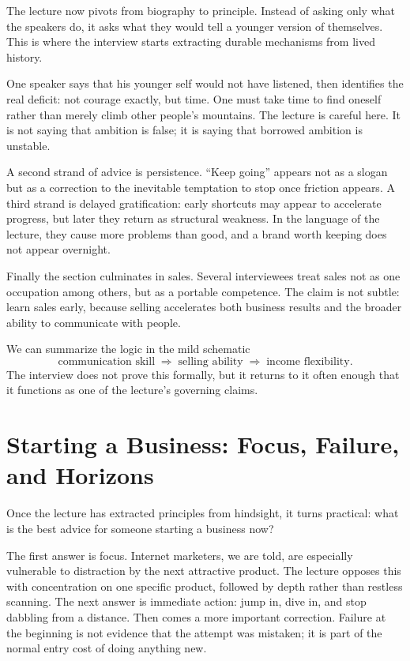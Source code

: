 The lecture now pivots from biography to principle. Instead of asking only what the speakers do, it asks what they would tell a younger version of themselves. This is where the interview starts extracting durable mechanisms from lived history.

One speaker says that his younger self would not have listened, then identifies the real deficit: not courage exactly, but time. One must take time to find oneself rather than merely climb other people's mountains. The lecture is careful here. It is not saying that ambition is false; it is saying that borrowed ambition is unstable.

A second strand of advice is persistence. ``Keep going'' appears not as a slogan but as a correction to the inevitable temptation to stop once friction appears. A third strand is delayed gratification: early shortcuts may appear to accelerate progress, but later they return as structural weakness. In the language of the lecture, they cause more problems than good, and a brand worth keeping does not appear overnight.

Finally the section culminates in sales. Several interviewees treat sales not as one occupation among others, but as a portable competence. The claim is not subtle: learn sales early, because selling accelerates both business results and the broader ability to communicate with people.

We can summarize the logic in the mild schematic
\begin{equation}
\text{communication skill} \;\Longrightarrow\; \text{selling ability} \;\Longrightarrow\; \text{income flexibility}.
\end{equation}
The interview does not prove this formally, but it returns to it often enough that it functions as one of the lecture's governing claims.

\section{Starting a Business: Focus, Failure, and Horizons}

Once the lecture has extracted principles from hindsight, it turns practical: what is the best advice for someone starting a business now?

The first answer is focus. Internet marketers, we are told, are especially vulnerable to distraction by the next attractive product. The lecture opposes this with concentration on one specific product, followed by depth rather than restless scanning. The next answer is immediate action: jump in, dive in, and stop dabbling from a distance. Then comes a more important correction. Failure at the beginning is not evidence that the attempt was mistaken; it is part of the normal entry cost of doing anything new.

